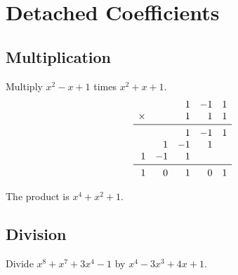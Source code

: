 \documentclass{article}
\begin{document}
        \section{Detached Coefficients}

        \subsection{Multiplication}

        Multiply $x^2 - x + 1$ times $x^2 + x + 1$.
        \begin{gather*}
        \begin{array}{rrrrrrr}
                       &    &  1 & -1 & 1\\
                \times &    &  1 &  1 & 1\\
                \midrule
                  &    &  1 & -1 & 1\\
                  &  1 & -1 &  1 \\
                1 & -1 & 1\\
                \midrule
                1 &  0 &  1 &  0 & 1\\
        \end{array}\\
        \end{gather*}

        The product is $x^4 + x^2 + 1$.

        \subsection{Division}

        Divide $x^8 + x^7 + 3x^4 - 1$ by $x^4 - 3x^3 + 4x + 1$.
\end{document}
